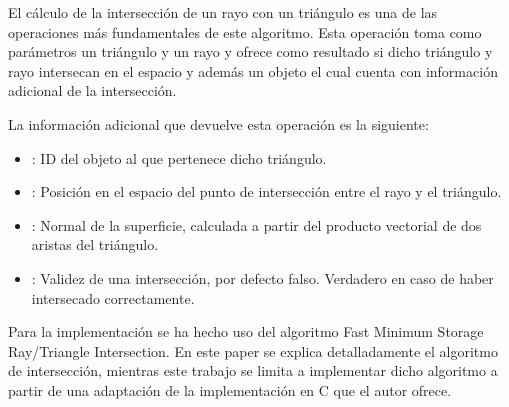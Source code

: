 El cálculo de la intersección de un rayo con un triángulo es una de las operaciones más fundamentales de este algoritmo. Esta operación toma como parámetros un triángulo  y un rayo  y ofrece como resultado si dicho triángulo y rayo intersecan en el espacio y además un objeto  el cual cuenta con información adicional de la intersección.

La información adicional que devuelve esta operación es la siguiente:

\begin{itemize}
	
	\item {}: ID del objeto al que pertenece dicho triángulo.
	
	\item {}: Posición en el espacio del punto de intersección entre el rayo y el triángulo.
	
	\item {}: Normal de la superficie, calculada a partir del producto vectorial de dos aristas del triángulo.
	
	\item {}: Validez de una intersección, por defecto falso. Verdadero en caso de haber intersecado correctamente.

\end{itemize}

Para la implementación se ha hecho uso del algoritmo Fast Minimum Storage Ray/Triangle Intersection\cite{moller1997fast}. En este paper se explica detalladamente el algoritmo de intersección, mientras este trabajo se limita a implementar dicho algoritmo a partir de una adaptación de la implementación en C que el autor ofrece.
	
